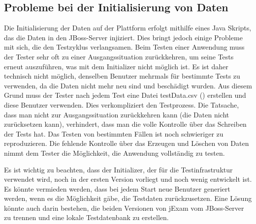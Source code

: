 \subsection{Probleme bei der Initialisierung von Daten}

Die Initialisierung der Daten auf der Plattform erfolgt mithilfe
eines Java Skripts, das die Daten in den JBoss-Server injiziert.
Dies bringt jedoch einige Probleme mit sich, die den Testzyklus
verlangsamen. Beim Testen einer Anwendung muss der Tester sehr
oft zu einer Ausgangssituation zurückkehren, um seine Tests erneut
auszuführen, was mit dem Initializer nicht möglich ist. Es ist daher
technisch nicht möglich, denselben Benutzer mehrmals für bestimmte
Tests zu verwenden, da die Daten nicht mehr neu sind und beschädigt
wurden. Aus diesem Grund muss der Tester nach jedem Test eine Datei
testData.csv () erstellen und diese Benutzer
verwenden. Dies verkompliziert den Testprozess. Die Tatsache, dass
man nicht zur Ausgangssituation zurückkehren kann (die Daten nicht
zurücksetzen kann), verhindert, dass man die volle Kontrolle über
das Schreiben der Tests hat. Das Testen von bestimmten Fällen ist
noch schwieriger zu reproduzieren. Die fehlende Kontrolle über das
Erzeugen und Löschen von Daten nimmt dem Tester die Möglichkeit,
die Anwendung vollständig zu testen.

Es ist wichtig zu beachten, dass der Initializer, der für die
Testinfrastruktur verwendet wird, noch in der ersten Version
vorliegt und noch wenig entwickelt ist. Es könnte vermieden werden,
dass bei jedem Start neue Benutzer generiert werden, wenn es die
Möglichkeit gäbe, die Testdaten zurückzusetzen.  Eine Lösung könnte
auch darin bestehen, die beiden Versionen von jExam vom JBoss-Server
zu trennen und eine lokale Testdatenbank zu erstellen.

